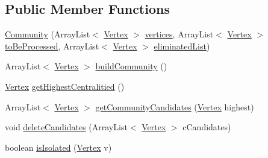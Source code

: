 \subsection*{Public Member Functions}
\begin{DoxyCompactItemize}
\item 
\hyperlink{classmain_1_1java_1_1com_1_1company_1_1dijkstratest_1_1_community_a948a27b50995af847cd53c449349ed7c}{Community} (Array\-List$<$ \hyperlink{classmain_1_1java_1_1com_1_1company_1_1dijkstratest_1_1_vertex}{Vertex} $>$ \hyperlink{classmain_1_1java_1_1com_1_1company_1_1dijkstratest_1_1_community_a00e314391bafea784ad183152dcd6091}{vertices}, Array\-List$<$ \hyperlink{classmain_1_1java_1_1com_1_1company_1_1dijkstratest_1_1_vertex}{Vertex} $>$ \hyperlink{classmain_1_1java_1_1com_1_1company_1_1dijkstratest_1_1_community_a2ccabf2789253dffe72aa412e7412f7d}{to\-Be\-Processed}, Array\-List$<$ \hyperlink{classmain_1_1java_1_1com_1_1company_1_1dijkstratest_1_1_vertex}{Vertex} $>$ \hyperlink{classmain_1_1java_1_1com_1_1company_1_1dijkstratest_1_1_community_a580104f4f16e9646bb1c4b3ea36c20a5}{eliminated\-List})
\item 
Array\-List$<$ \hyperlink{classmain_1_1java_1_1com_1_1company_1_1dijkstratest_1_1_vertex}{Vertex} $>$ \hyperlink{classmain_1_1java_1_1com_1_1company_1_1dijkstratest_1_1_community_ac67908826386b0b27d640714ddca078c}{build\-Community} ()
\item 
\hyperlink{classmain_1_1java_1_1com_1_1company_1_1dijkstratest_1_1_vertex}{Vertex} \hyperlink{classmain_1_1java_1_1com_1_1company_1_1dijkstratest_1_1_community_af8ba9d3ca770ca1683efe6e0b842d2d5}{get\-Highest\-Centralitied} ()
\item 
Array\-List$<$ \hyperlink{classmain_1_1java_1_1com_1_1company_1_1dijkstratest_1_1_vertex}{Vertex} $>$ \hyperlink{classmain_1_1java_1_1com_1_1company_1_1dijkstratest_1_1_community_a11c0953e985a94460b905218c3c80291}{get\-Community\-Candidates} (\hyperlink{classmain_1_1java_1_1com_1_1company_1_1dijkstratest_1_1_vertex}{Vertex} highest)
\item 
void \hyperlink{classmain_1_1java_1_1com_1_1company_1_1dijkstratest_1_1_community_aba4c016c6178f4b4f6e2a29874c0c619}{delete\-Candidates} (Array\-List$<$ \hyperlink{classmain_1_1java_1_1com_1_1company_1_1dijkstratest_1_1_vertex}{Vertex} $>$ c\-Candidates)
\item 
boolean \hyperlink{classmain_1_1java_1_1com_1_1company_1_1dijkstratest_1_1_community_ab4d06c5bd90490a5713b1aa083cdeef9}{is\-Isolated} (\hyperlink{classmain_1_1java_1_1com_1_1company_1_1dijkstratest_1_1_vertex}{Vertex} v)
\end{DoxyCompactItemize}
